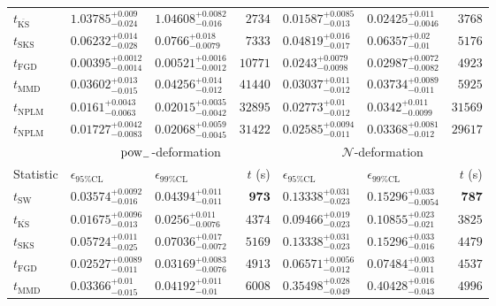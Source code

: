 \begin{tabular}{l|llr|llr}
	$t_{\overline{\mathrm{KS}}}$ & $1.03785_{-0.024}^{+0.009}$ & $1.04608_{-0.016}^{+0.0082}$ & $2734$ & ${\mathbf{0.01587_{-0.013}^{+0.0085}}}$ & ${\mathbf{0.02425_{-0.0046}^{+0.011}}}$ & $3768$ \\
	$t_{\mathrm{SKS}}$ & $0.06232_{-0.028}^{+0.014}$ & $0.0766_{-0.0079}^{+0.018}$ & $7333$ & $0.04819_{-0.017}^{+0.016}$ & $0.06357_{-0.01}^{+0.02}$ & $5176$ \\
	$t_{\mathrm{FGD}}$ & ${\mathbf{0.00395_{-0.0014}^{+0.0012}}}$ & ${\mathbf{0.00521_{-0.0012}^{+0.0016}}}$ & $10771$ & $0.0243_{-0.0098}^{+0.0079}$ & $0.02987_{-0.0082}^{+0.0072}$ & $4923$ \\
	$t_{\mathrm{MMD}}$ & $0.03602_{-0.015}^{+0.013}$ & $0.04256_{-0.012}^{+0.014}$ & $41440$ & $0.03037_{-0.012}^{+0.011}$ & $0.03734_{-0.011}^{+0.0089}$ & $5925$ \\
\rowcolor{red!35}	$t_{\mathrm{NPLM}}$ & $0.0161_{-0.0063}^{+0.0043}$ & $0.02015_{-0.0042}^{+0.0035}$ & $32895$ & $0.02773_{-0.012}^{+0.01}$ & $0.0342_{-0.0099}^{+0.011}$ & $31569$ \\
\rowcolor{blue!35}	$t_{\mathrm{NPLM}}$ & $0.01727_{-0.0083}^{+0.0042}$ & $0.02068_{-0.0045}^{+0.0059}$ & $31422$ & $0.02585_{-0.011}^{+0.0094}$ & $0.03368_{-0.012}^{+0.0081}$ & $29617$ \\
	\toprule
	\multicolumn{1}{c}{} & \multicolumn{3}{c}{$\rm{pow}_{-}$-deformation} & \multicolumn{3}{c}{$\mathcal{N}$-deformation} \\
Statistic & $\epsilon_{95\%\mathrm{CL}}$ & $\epsilon_{99\%\mathrm{CL}}$ & $t$ (s) & $\epsilon_{95\%\mathrm{CL}}$ & $\epsilon_{99\%\mathrm{CL}}$ & $t$ (s) \\
	\midrule
	$t_{\mathrm{SW}}$ & $0.03574_{-0.016}^{+0.0092}$ & $0.04394_{-0.011}^{+0.011}$ & ${\mathbf{973}}$ & $0.13338_{-0.023}^{+0.031}$ & $0.15296_{-0.0054}^{+0.033}$ & ${\mathbf{787}}$ \\
	$t_{\overline{\mathrm{KS}}}$ & ${\mathbf{0.01675_{-0.013}^{+0.0096}}}$ & ${\mathbf{0.0256_{-0.0076}^{+0.011}}}$ & $4374$ & $0.09466_{-0.023}^{+0.019}$ & $0.10855_{-0.021}^{+0.023}$ & $3825$ \\
	$t_{\mathrm{SKS}}$ & $0.05724_{-0.025}^{+0.011}$ & $0.07036_{-0.0072}^{+0.017}$ & $5169$ & $0.13338_{-0.023}^{+0.031}$ & $0.15296_{-0.016}^{+0.033}$ & $4479$ \\
	$t_{\mathrm{FGD}}$ & $0.02527_{-0.011}^{+0.0089}$ & $0.03169_{-0.0076}^{+0.0083}$ & $4913$ & ${\mathbf{0.06571_{-0.012}^{+0.0056}}}$ & ${\mathbf{0.07484_{-0.011}^{+0.003}}}$ & $4537$ \\
	$t_{\mathrm{MMD}}$ & $0.03366_{-0.015}^{+0.01}$ & $0.04192_{-0.01}^{+0.011}$ & $6008$ & $0.35498_{-0.049}^{+0.028}$ & $0.40428_{-0.043}^{+0.016}$ & $4996$ \\

\end{tabular}
